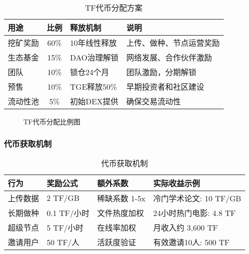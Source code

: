 \documentclass[12pt,a4paper]{article}
\begin{document}
\begin{table}[h]
\centering
\begin{tabular}{|l|c|l|l|}
\hline
\textbf{用途} & \textbf{比例} & \textbf{释放机制} & \textbf{说明} \\
\hline
挖矿奖励 & 60\% & 10年线性释放 & 上传、做种、节点运营奖励 \\
\hline
生态基金 & 15\% & DAO治理解锁 & 网络发展、合作伙伴激励 \\
\hline
团队 & 10\% & 锁仓24个月 & 团队激励，分期解锁 \\
\hline
预售 & 10\% & TGE释放50\% & 早期投资者和社区建设 \\
\hline
流动性池 & 5\% & 初始DEX提供 & 确保交易流动性 \\
\hline
\end{tabular}
\caption{TF代币分配方案}
\end{table}

\begin{figure}[h]
\centering
{}
\caption{TF代币分配比例图}
\end{figure}

\subsubsection{代币获取机制}

\begin{table}[h]
\centering
\begin{tabular}{|l|l|l|l|}
\hline
\textbf{行为} & \textbf{奖励公式} & \textbf{额外系数} & \textbf{实际收益示例} \\
\hline
上传数据 & 2 TF/GB & 稀缺系数 1-5x & 冷门学术论文: 10 TF/GB \\
\hline
长期做种 & 0.1 TF/小时 & 文件热度加权 & 24小时热门电影: 4.8 TF \\
\hline
超级节点 & 5 TF/小时 & 在线率加权 & 月收入约 3,600 TF \\
\hline
邀请用户 & 50 TF/人 & 活跃度验证 & 有效邀请10人: 500 TF \\
\hline
\end{tabular}
\caption{代币获取机制}
\end{table}
\end{document}
